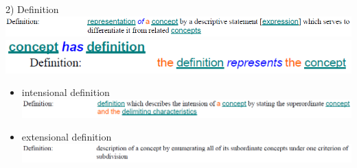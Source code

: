 \documentclass[t,12pt,english
\ifx\beamermode\undefined\else,\beamermode\fi
]{beamer}
\begin{document}
\begin{frame}{2) Definition}
	\includegraphics[width=\linewidth]{assets/definition}
	\vspace*{0.35cm}
	\includegraphics[width=0.65\linewidth]{assets/conceptHasDefinition}
	
	
	\begin{itemize}
		\item intensional definition
		\includegraphics[width=\linewidth]{assets/intensionalDefinition}
		\item extensional definition
		\includegraphics[width=\linewidth]{assets/extensionalDefinition}
	\end{itemize}
	
\end{frame}
\end{document}
